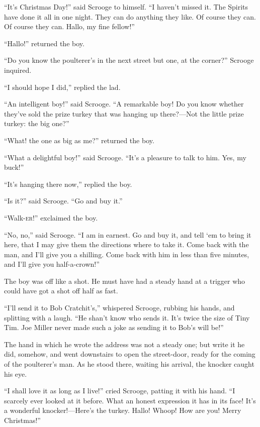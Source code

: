 \documentclass[paper=5.5in:8.5in,BCOR=15mm,twoside,DIV=15,headinclude=off,12pt,chapterprefix=off,openany,headings=huge]{scrbook} %
\begin{document}
\enquote{It's Christmas Day!} said Scrooge to himself. \enquote{I haven't missed it. The Spirits have done it all in one night. They can do anything they like. Of course they can. Of course they can. Hallo, my fine fellow!}

\enquote{Hallo!} returned the boy.

\enquote{Do you know the poulterer's in the next street but one, at the corner?} Scrooge inquired.

\enquote{I should hope I did,} replied the lad.

\enquote{An intelligent boy!} said Scrooge. \enquote{A remarkable boy! Do you know whether they've sold the prize turkey that was hanging up there?—Not the little prize turkey: the big one?}

\enquote{What! the one as big as me?} returned the boy.

\enquote{What a delightful boy!} said Scrooge. \enquote{It's a pleasure to talk to him. Yes, my buck!}

\enquote{It's hanging there now,} replied the boy.

\enquote{Is it?} said Scrooge. \enquote{Go and buy it.}

\enquote{Walk-\textsc{er}!} exclaimed the boy.

\enquote{No, no,} said Scrooge. \enquote{I am in earnest. Go and buy it, and tell `em to bring it here, that I may give them the directions where to take it. Come back with the man, and I'll give you a shilling. Come back with him in less than five minutes, and I'll give you half-a-crown!}

The boy was off like a shot. He must have had a steady hand at a trigger who could have got a shot off half as fast.

\enquote{I'll send it to Bob Cratchit's,} whispered Scrooge, rubbing his hands, and splitting with a laugh. \enquote{He shan't know who sends it. It's twice the size of Tiny Tim. Joe Miller never made such a joke as sending it to Bob's will be!}

The hand in which he wrote the address was not a steady one; but write it he did, somehow, and went downstairs to open the street-door, ready for the coming of the poulterer's man. As he stood there, waiting his arrival, the knocker caught his eye.

\enquote{I shall love it as long as I live!} cried Scrooge, patting it with his hand. \enquote{I scarcely ever looked at it before. What an honest expression it has in its face! It's a wonderful knocker!—Here's the turkey. Hallo! Whoop! How are you! Merry Christmas!}
\end{document}
